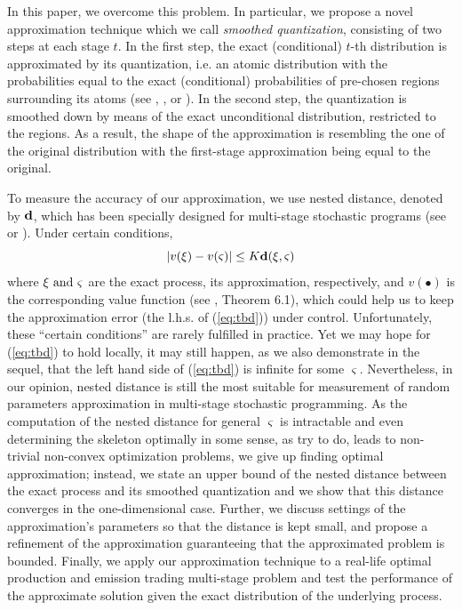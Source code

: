 \documentclass{article}              %
\begin{document}
In this paper, we overcome this problem. In particular, we propose a novel approximation technique which we call \emph{smoothed quantization}, consisting of two steps at each stage $t$. In the first step, the exact
(conditional) $t$-th distribution is approximated by its quantization,
i.e. an atomic distribution with the probabilities equal to the exact
(conditional) probabilities of pre-chosen regions surrounding its
atoms (see \cite{lohndorf2019modeling}, \cite{kreitmeier2011optimal}, or \cite{Pflug01}). In
the second step, the quantization is smoothed down by means of the
exact unconditional distribution, restricted to the regions. As a
result, the shape of the approximation is resembling the one of the original distribution with the first-stage approximation being equal to the original.

To measure the accuracy of our approximation, we use nested distance, denoted by 
$\mathbf{d}$, which has been specially designed for multi-stage stochastic programs (see
\cite{pflug2012distance} or \cite{pflug2014multistage}). Under
certain conditions, 
\begin{equation}
|v(\xi)-v(\varsigma)|\leq K\mathbf{d}(\xi,\varsigma)\label{eq:tbd}
\end{equation}
where $\text{\ensuremath{\xi} and \ensuremath{\varsigma} }$are the
exact process, its approximation, respectively, and $\ensuremath{v(\bullet)}$
is the corresponding value function (see \cite{pflug2014multistage},
Theorem 6.1), which could help us to keep the approximation error (the l.h.s. of (\ref{eq:tbd})) under control. Unfortunately, these ``certain conditions'' are rarely
fulfilled in practice. Yet we may hope for (\ref{eq:tbd}) to hold
locally, it may still happen, as we also demonstrate in the sequel, 
that the left hand side of (\ref{eq:tbd}) is infinite for some $\varsigma$.
Nevertheless, in our opinion, nested distance is still the most
suitable for measurement of random parameters approximation in multi-stage stochastic programming. As the computation of the nested distance for general $\varsigma$ is intractable and even determining the skeleton optimally in some sense, as \cite{lohndorf2019modeling} try to do, leads to non-trivial non-convex optimization problems, we give up finding optimal approximation; instead, we state an upper bound
of the nested distance between the exact process and its smoothed
quantization and we show that this distance converges in the one-dimensional
case. Further, we discuss settings of the approximation's parameters so
that the distance is kept small, and propose a refinement of the
approximation guaranteeing that the approximated problem is bounded. 
Finally, we apply our
approximation technique to a real-life optimal production and emission
trading multi-stage problem and test the performance of the approximate
solution given the exact distribution of the underlying process.
\end{document}
